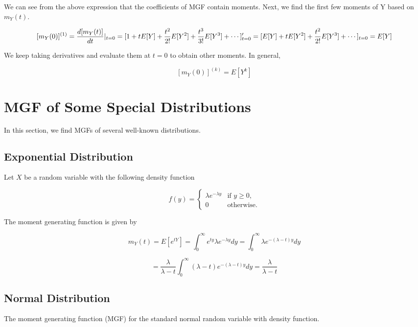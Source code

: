 \documentclass[
]{book}
\begin{document}
We can see from the above expression that the coefficients of MGF contain moments. Next, we find the first few moments of Y based on \(m_Y(t)\).

\[
[m_Y(0)]^{(1)}=\frac{d[m_Y(t)]}{dt}|_{t=0} = [1 + tE[Y] + \frac{t^2}{2!}E[Y^2] + \frac{t^3}{3!}E[Y^3] + \cdots]^\prime_{t=0} \\
= [E[Y] + tE[Y^2] + \frac{t^2}{2!}E[Y^3] + \cdots]_{t=0} = E[Y]
\]

We keep taking derivatives and evaluate them at \(t = 0\) to obtain other moments. In general,

\[
[m_Y(0)]^{(k)} = E[Y^k]
\]

\hypertarget{mgf-of-some-special-distributions}{%
\section{MGF of Some Special Distributions}\label{mgf-of-some-special-distributions}}

In this section, we find MGFs of several well-known distributions.

\hypertarget{exponential-distribution}{%
\subsection{Exponential Distribution}\label{exponential-distribution}}

Let \(X\) be a random variable with the following density function

\[
\displaystyle f(y) = \begin{cases} 
 \lambda e^{-\lambda y} & \text{if $y \ge 0$}, \\  
 0 & \text{otherwise}.
 \end{cases}
\]

The moment generating function is given by

\[
m_Y(t) = E[e^{tY}] = \int_0^\infty e^{ty} \lambda e^{-\lambda y}dy = \int_0^\infty \lambda e^{-(\lambda-t)y}dy
\]

\[
=\frac{\lambda}{\lambda -t}\int_0^\infty (\lambda -t)e^{-(\lambda-t)y}dy = \frac{\lambda}{\lambda -t}
\]

\hypertarget{normal-distribution-1}{%
\subsection{Normal Distribution}\label{normal-distribution-1}}

The moment generating function (MGF) for the standard normal random variable with density function.
\end{document}
